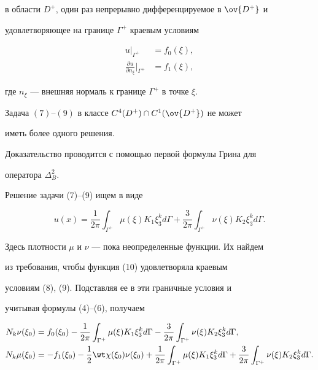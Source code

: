 в области $D^+$, один раз непрерывно дифференцируемое в $\ov{D^+}$ и 


удовлетворяющее на границе $\Gamma^+$ краевым условиям 


\begin{align} 


u|_{\Gamma^+}&=f_0(\xi),\\ 


\frac{\partial u}{\partial n_\xi}\Big|_{\Gamma^+}&= 


f_1(\xi), 


\end{align} 


где $n_\xi$ --- внешняя нормаль к границе $\Gamma^+$ в точке $\xi$. 


 


\begin{thm} 


Задача $(7)$--$(9)$ в классе $C^4(D^+)\cap C^1(\ov{D^+})$ не может 


иметь более одного решения. 


\end{thm} 


 


Доказательство проводится с помощью первой формулы Грина для 


оператора $\Delta^2_B$. 


 


Решение задачи (7)--(9) ищем в виде 


\begin{equation} 


u(x)=\frac{1}{2\pi}\int_{\Gamma^+}\mu(\xi)K_1 


\xi^k_3d\Gamma+\frac{3}{2\pi}\int_{\Gamma^+} 


\nu(\xi) K_2\xi^k_3d\Gamma. 


\end{equation} 


Здесь плотности $\mu$ и $\nu$ --- пока неопределенные функции. Их найдем 


из требования, чтобы функция (10) удовлетворяла краевым 


условиям (8), (9). Подставляя ее в эти граничные условия и 


учитывая формулы (4)--(6), получаем 


\begin{align*} 


N_k\nu(\xi_0)&= f_0(\xi_0)-\frac{1}{2\pi}\int_{\Gamma^+} 


\mu(\xi)K_1\xi^k_3d\Gamma-\frac{3}{2\pi}\int_{\Gamma^+} 


\nu(\xi)K_2\xi^k_3d\Gamma,\\ 


% 


N_k\mu(\xi_0)&=-f_1(\xi_0)-\frac{1}{2}\wt\chi(\xi_0)\nu(\xi_0)+ 


\frac{1}{2\pi}\int_{\Gamma^+}\mu(\xi)K_1\xi^k_3d\Gamma+ 


\frac{3}{2\pi}\int_{\Gamma^+}\nu(\xi)K_2\xi^k_3d\Gamma. 


\end{align*} 


